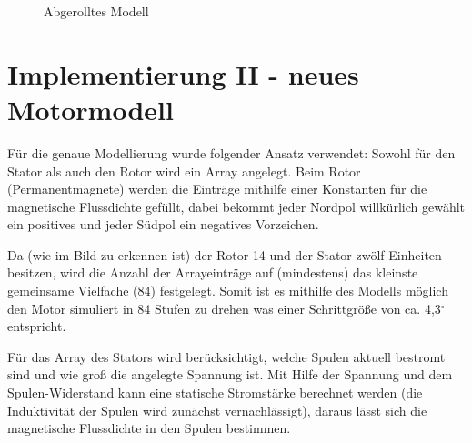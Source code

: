 \begin{figure}[htbp]
	\begin{center}
		\caption{Abgerolltes Modell}
		\label{FigAbgerolltesModell}
	\end{center}
	
\end{figure}

\section{Implementierung II - neues Motormodell}
Für die genaue Modellierung wurde folgender Ansatz verwendet: Sowohl für den Stator als auch den Rotor wird ein Array angelegt. Beim Rotor (Permanentmagnete) werden die Einträge mithilfe einer Konstanten für die magnetische Flussdichte gefüllt, dabei bekommt jeder Nordpol willkürlich gewählt ein positives und jeder Südpol ein negatives Vorzeichen. 

Da (wie im Bild zu erkennen ist) der Rotor 14 und der Stator zwölf Einheiten besitzen, wird die Anzahl der Arrayeinträge auf (mindestens) das kleinste gemeinsame Vielfache (84) festgelegt. Somit ist es mithilfe des Modells möglich den Motor simuliert in 84 Stufen zu drehen was einer Schrittgröße von ca. 4,3$^{\circ}$ entspricht. 

Für das Array des Stators wird berücksichtigt, welche Spulen aktuell bestromt sind und wie groß die angelegte Spannung ist. Mit Hilfe der Spannung und dem Spulen-Widerstand kann eine statische Stromstärke berechnet werden (die Induktivität der Spulen wird zunächst vernachlässigt), daraus lässt sich die magnetische Flussdichte in den Spulen bestimmen. 

